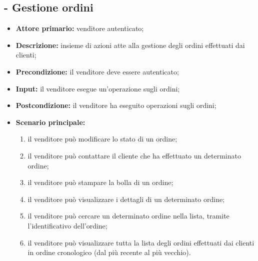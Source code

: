 \subsection{ - Gestione ordini}
\begin{itemize}
    \item \textbf{Attore primario:} venditore autenticato;
    \item \textbf{Descrizione:} insieme di azioni atte alla gestione degli ordini effettuati dai clienti;
    \item \textbf{Precondizione:} il venditore deve essere autenticato;
    \item \textbf{Input:} il venditore esegue un'operazione sugli ordini;
    \item \textbf{Postcondizione:} il venditore ha eseguito operazioni sugli ordini;
    \item \textbf{Scenario principale:}
          \begin{enumerate}
              \item il venditore può modificare lo stato di un ordine;
              \item il venditore può contattare il cliente che ha effettuato un determinato ordine;
              \item il venditore può stampare la bolla di un ordine;
              \item il venditore può visualizzare i dettagli di un determinato ordine;
              \item il venditore può cercare un determinato ordine nella lista, tramite l'identificativo dell'ordine;
              \item il venditore può visualizzare tutta la lista degli ordini effettuati dai clienti in ordine cronologico (dal più recente al più vecchio).
            \end{enumerate}
\end{itemize}

\stepsubUserCase
